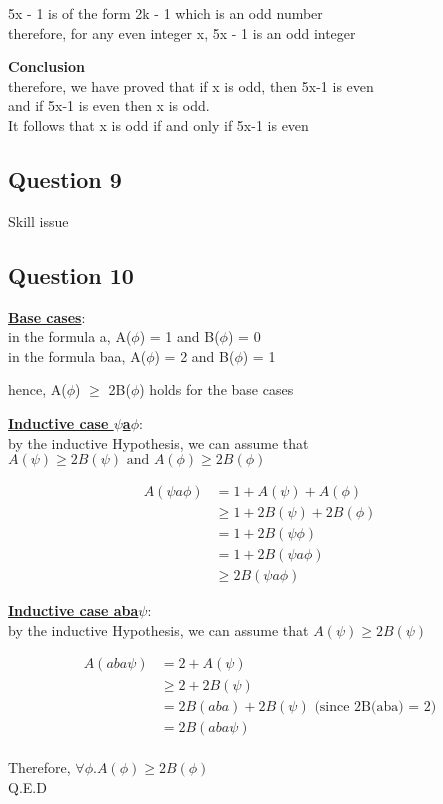 \documentclass[11pt]{article}
\begin{document}
{{{\noindent
5x - 1 is of the form 2k - 1 which is an odd number \\
therefore, for any even integer x, 5x - 1 is an odd integer

\noindent
\textbf{Conclusion} \\
therefore, we have proved that if x is odd, then 5x-1 is even \\
and if 5x-1 is even then x is odd. \\
It follows that x is odd if and only if 5x-1 is even

\subsection*{Question 9}
Skill issue

\subsection*{Question 10}
\underline{\textbf{Base cases}}: \\
in the formula a,
A($\phi$) = 1 and B($\phi$) = 0 \\
in the formula baa,
A($\phi$) = 2 and B($\phi$) = 1

hence, A($\phi$) $\geq$ 2B($\phi$) holds for the base cases

\noindent
\underline{\textbf{Inductive case $\psi$a$\phi$}}: \\
by the inductive Hypothesis, we can assume that
$A(\psi) \geq 2B(\psi) \text{ and } A(\phi) \geq 2B(\phi)$

\begin{align*}
    A(\psi a \phi) &= 1 + A(\psi) + A(\phi) \\
    &\geq 1 + 2B(\psi) + 2B(\phi) \\
    &= 1 + 2B(\psi \phi) \\
    &= 1 + 2B(\psi a \phi) \\
    &\geq 2B(\psi a \phi)
\end{align*}

\noindent
\underline{\textbf{Inductive case aba$\psi$}}: \\
by the inductive Hypothesis, we can assume that
$A(\psi) \geq 2B(\psi)$

\begin{align*}
    A(aba \psi) &= 2 + A(\psi) \\
    &\geq 2 + 2B(\psi) \\
    &= 2B(aba) + 2B(\psi) \text{ (since 2B(aba) = 2)} \\
    &= 2B(aba\psi)
\end{align*}
\\
Therefore, $\forall \phi . A(\phi) \geq 2B(\phi)$\\
Q.E.D
}}}
\end{document}
